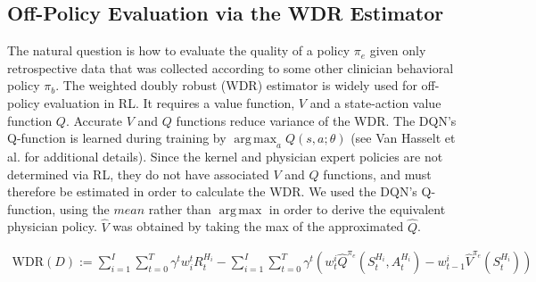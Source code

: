 \documentclass[10pt]{amia}
\DeclareMathOperator*{\argmax}{arg\,max}
\begin{document}
\subsection*{Off-Policy Evaluation via the WDR Estimator}
\label{subsec:wdr}
The natural question is how to evaluate the quality of a policy $\pi_e$ given only retrospective data that was collected according to some other clinician behavioral policy $\pi_b$. The weighted doubly robust (WDR) estimator\cite{thomas2016data} is widely used for off-policy evaluation in RL. It requires a value function, $V$ and a state-action value function $Q$. Accurate $V$ and $Q$ functions reduce variance of the WDR.\cite{jiang2015doubly} 
The DQN's Q-function is learned during training by $\argmax_{a}Q(s,a;\theta)$ (see Van Hasselt et al.\cite{van2016deep} for additional details). Since the kernel and physician expert policies are not determined via RL, they do not have associated $V$ and $Q$ functions, and must therefore be estimated in order to calculate
the WDR. We used the DQN's Q-function, using the $mean$ rather than $\argmax$ in order to derive
the equivalent physician policy. $\hat{V}$ was obtained by taking the max of the approximated $\hat{Q}$. 


\begin{align}
\label{eq:wdr}
\text{WDR}(D) := \sum_{i=1}^I\sum_{t=0}^{T} \gamma^tw_i^tR_t^{H_i} -  \sum_{i=1}^I\sum_{t=0}^{T}\gamma^t(w_t^i\hat{Q}^{\pi_e}(S_t^{H_i}, A_t^{H_i}) - w_{t-1}^i\hat{V}^{\pi_e}(S_t^{H_i}))
\end{align}
\end{document}
